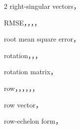 \begin{multicols}{2}
\noindent right-singular vectors，\par
\noindent RMSE，，，，\par
\noindent root mean square error，\par
\noindent rotation，，，\par
\noindent rotation matrix，\par
\noindent row，，，，，，\par
\noindent row vector，\par
\noindent row-echelon form，\par


\end{multicols}
